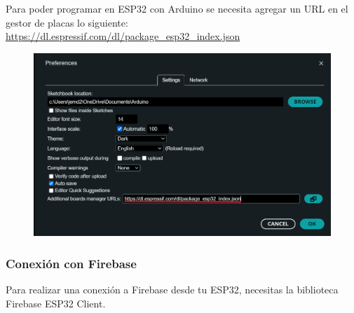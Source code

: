 \documentclass[../main]{subfiles}
\begin{document}
Para poder programar en ESP32 con Arduino se necesita agregar un URL en el gestor de placas lo siguiente:
\url{https://dl.espressif.com/dl/package_esp32_index.json}

\begin{figure}[H]
	\centering
	\includegraphics[width = 13cm]{res/configuracionParaEsp32.png}
\end{figure}

\subsubsection{Conexión con Firebase}

Para realizar una conexión a Firebase desde tu ESP32, necesitas la biblioteca Firebase ESP32 Client.
\end{document}
